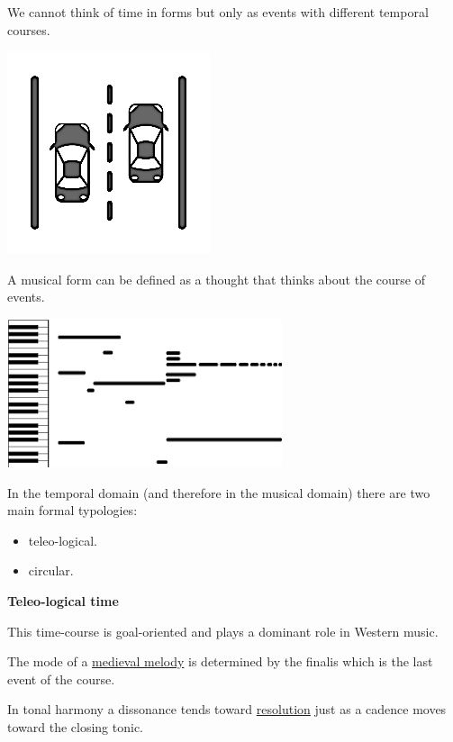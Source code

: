 We cannot think of time in forms but only as events with different temporal courses.

\begin{center}
\includegraphics[scale=0.3]{../img/corsie.png}
\end{center}

A musical form can be defined as a thought that thinks about the course of events.

\begin{center}
\includegraphics[scale=0.7]{../img/pianoroll.png}
\end{center}

In the temporal domain (and therefore in the musical domain) there are two main formal typologies:

\begin{itemize}
\tightlist
\item teleo-logical.
\item circular.
\end{itemize}

\textbf{Teleo-logical time}\label{teleo-logical-time}

This time-course is goal-oriented and plays a dominant role in Western music.

The mode of a \href{http://www.musicaecodice.it/gitmedia/emc/3_media/finalis.mp3}{medieval melody} is determined by the finalis which is the last event of the course.

In tonal harmony a dissonance tends toward \href{http://www.musicaecodice.it/gitmedia/emc/3_media/risolvi.mp3}{resolution} just as a cadence moves toward the closing tonic.


